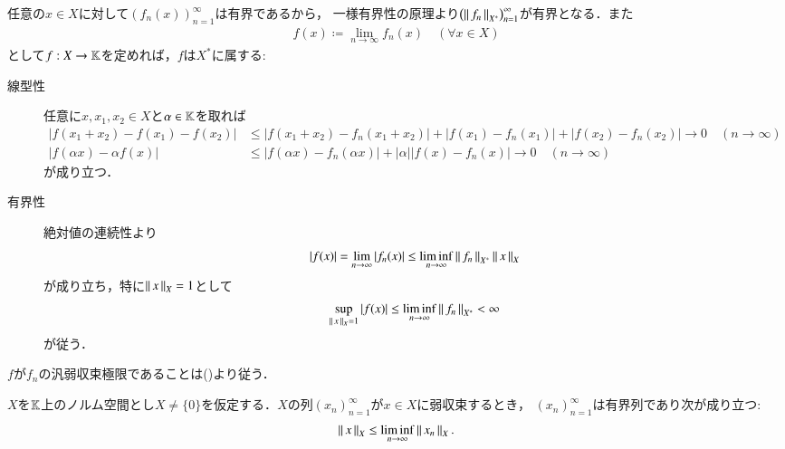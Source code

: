	\begin{prf}
		任意の$x \in X$に対して$\left( f_n(x) \right)_{n=1}^{\infty}$は有界であるから，
		一様有界性の原理より$\left( \left\|\, f_n\, \right\|_{X^*} \right)_{n=1}^{\infty}$が有界となる．また
		\begin{align}
			f(x) \coloneqq \lim_{n \to \infty} f_n(x) \quad (\forall x \in X)
			\label{eq:thm_weak_star_convergence_bonded}
		\end{align}
		として$f:X \rightarrow \mathbb{K}$を定めれば，$f$は$X^*$に属する:
		\begin{description}
			\item[線型性]
				任意に$x,x_1,x_2 \in X$と$\alpha \in \mathbb{K}$を取れば
				\begin{align}
					\left| f(x_1 + x_2) - f(x_1) - f(x_2) \right| &\leq \left| f(x_1 + x_2) - f_n (x_1 + x_2)\right| + \left| f(x_1) - f_n(x_1) \right| 
						+ \left| f(x_2) - f_n(x_2) \right| \longrightarrow 0 \quad (n \longrightarrow \infty) \\
					\left| f(\alpha x) - \alpha f(x) \right| &\leq \left| f(\alpha x) - f_n(\alpha x) \right| + |\alpha| \left| f(x) - f_n(x) \right|
						\longrightarrow 0 \quad (n \longrightarrow \infty)
				\end{align}
				が成り立つ．
			
			\item[有界性]
				絶対値の連続性より
				\begin{align}
					\left| f(x) \right| = \lim_{n \to \infty} \left| f_n(x) \right| \leq \liminf_{n \to \infty} \left\|\, f_n\, \right\|_{X^*} \left\|\, x\, \right\|_{X}
				\end{align}
				が成り立ち，特に$\left\|\, x\, \right\|_{X} = 1$として
				\begin{align}
					\operatorname*{sup}_{\left\|\, x\, \right\|_{X} = 1} \left| f(x) \right| \leq \liminf_{n \to \infty} \left\|\, f_n\, \right\|_{X^*} < \infty
				\end{align}
				が従う．
		\end{description}
		$f$が$f_n$の汎弱収束極限であることは()より従う．
		\QED
	\end{prf}
	
	\begin{screen}
		\begin{thm}[弱収束列の有界性]
			$X$を$\mathbb{K}$上のノルム空間とし$X \neq \{0\}$を仮定する．$X$の列$(x_n)_{n=1}^{\infty}$が$x \in X$に弱収束するとき，
			$(x_n)_{n=1}^{\infty}$は有界列であり次が成り立つ:
			\begin{align}
				\left\|\, x\, \right\|_{X} \leq \liminf_{n \to \infty} \left\|\, x_n\, \right\|_{X}.
			\end{align}
		\end{thm}
	\end{screen}
	
